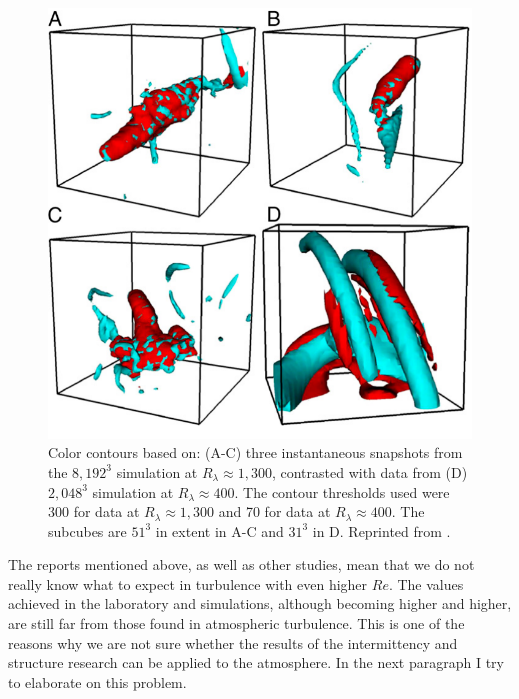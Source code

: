 \documentclass[../main.tex]{subfiles}
\begin{document}
\begin{figure}
\centering
\noindent \includegraphics[width=30pc]{gfx/Yeung_chunky_vortices.png}
\caption{Color contours based on: (A-C) three instantaneous snapshots from the $8,192^3$ simulation at $R_\lambda \approx 1,300$, contrasted with data from (D) $2,048^3$ simulation at $R_\lambda \approx 400$. The contour thresholds used were 300 for data at $R_\lambda \approx 1,300$ and 70 for data at $R_\lambda \approx 400$. The subcubes are $51^3$ in extent in A-C and $31^3$ in D. Reprinted from \citet{Yeung2015}.}
\label{fig:ch1_03}
\end{figure}

The reports mentioned above, as well as other studies, mean that we do not really know what to expect in turbulence with even higher $Re$. The values achieved in the laboratory and simulations, although becoming higher and higher, are still far from those found in atmospheric turbulence. This is one of the reasons why we are not sure whether the results of the intermittency and structure research can be applied to the atmosphere. In the next paragraph I try to elaborate on this problem.
 
\end{document}
